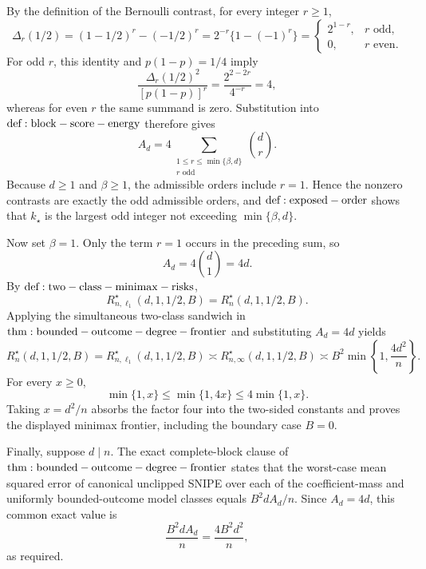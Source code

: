 By the definition of the Bernoulli contrast, for every integer \(r\ge1\),
\[
\Delta_r(1/2)=(1-1/2)^r-(-1/2)^r
=2^{-r}\{1-(-1)^r\}
=\begin{cases}
2^{1-r},&r\text{ odd},\\
0,&r\text{ even}.
\end{cases}
\]
For odd \(r\), this identity and \(p(1-p)=1/4\) imply
\[
\frac{\Delta_r(1/2)^2}{[p(1-p)]^r}
=\frac{2^{2-2r}}{4^{-r}}=4,
\]
whereas for even \(r\) the same summand is zero. Substitution into \({\rm def:block-score-energy}\) therefore gives
\[
A_d
=4\sum_{\substack{1\le r\le\min\{\beta,d\}\\r\text{ odd}}}\binom dr.
\]
Because \(d\ge1\) and \(\beta\ge1\), the admissible orders include \(r=1\). Hence the nonzero contrasts are exactly the odd admissible orders, and \({\rm def:exposed-order}\) shows that \(k_\star\) is the largest odd integer not exceeding \(\min\{\beta,d\}\).

Now set \(\beta=1\). Only the term \(r=1\) occurs in the preceding sum, so
\[
A_d=4\binom d1=4d.
\]
By \({\rm def:two-class-minimax-risks}\),
\[
R_{n,\ell_1}^{\star}(d,1,1/2,B)=R_n^\star(d,1,1/2,B).
\]
Applying the simultaneous two-class sandwich in \({\rm thm:bounded-outcome-degree-frontier}\) and substituting \(A_d=4d\) yields
\[
R_n^\star(d,1,1/2,B)
=R_{n,\ell_1}^{\star}(d,1,1/2,B)
\asymp R_{n,\infty}^{\star}(d,1,1/2,B)
\asymp B^2\min\!\left\{1,\frac{4d^2}{n}\right\}.
\]
For every \(x\ge0\),
\[
\min\{1,x\}\le\min\{1,4x\}\le4\min\{1,x\}.
\]
Taking \(x=d^2/n\) absorbs the factor four into the two-sided constants and proves the displayed minimax frontier, including the boundary case \(B=0\).

Finally, suppose \(d\mid n\). The exact complete-block clause of \({\rm thm:bounded-outcome-degree-frontier}\) states that the worst-case mean squared error of canonical unclipped SNIPE over each of the coefficient-mass and uniformly bounded-outcome model classes equals \(B^2dA_d/n\). Since \(A_d=4d\), this common exact value is
\[
\frac{B^2dA_d}{n}=\frac{4B^2d^2}{n},
\]
as required.